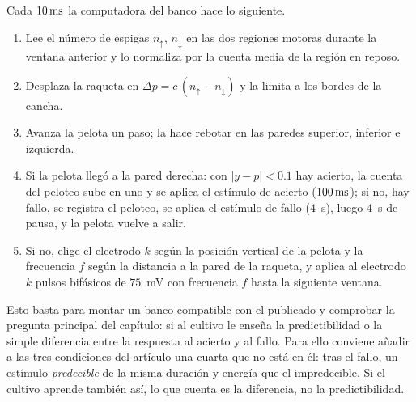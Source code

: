 Cada $10\,\text{ms}$ la computadora del banco hace lo siguiente.
\begin{enumerate}
\item Lee el número de espigas $n_\uparrow$, $n_\downarrow$ en las dos regiones motoras durante la ventana anterior y lo normaliza por la cuenta media de la región en reposo.
\item Desplaza la raqueta en $\Delta p=c\,(n_\uparrow-n_\downarrow)$ y la limita a los bordes de la cancha.
\item Avanza la pelota un paso; la hace rebotar en las paredes superior, inferior e izquierda.
\item Si la pelota llegó a la pared derecha: con $|y-p|<0.1$ hay acierto, la cuenta del peloteo sube en uno y se aplica el estímulo de acierto ($100\,\text{ms}$); si no, hay fallo, se registra el peloteo, se aplica el estímulo de fallo ($4$~s), luego $4$~s de pausa, y la pelota vuelve a salir.
\item Si no, elige el electrodo $k$ según la posición vertical de la pelota y la frecuencia $f$ según la distancia a la pared de la raqueta, y aplica al electrodo $k$ pulsos bifásicos de $75$~mV con frecuencia $f$ hasta la siguiente ventana.
\end{enumerate}
Esto basta para montar un banco compatible con el publicado y comprobar la pregunta principal del capítulo: si al cultivo le enseña la predictibilidad o la simple diferencia entre la respuesta al acierto y al fallo. Para ello conviene añadir a las tres condiciones del artículo una cuarta que no está en él: tras el fallo, un estímulo \emph{predecible} de la misma duración y energía que el impredecible. Si el cultivo aprende también así, lo que cuenta es la diferencia, no la predictibilidad.
